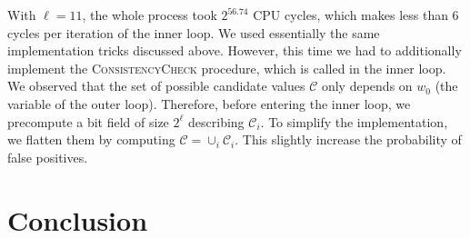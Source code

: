 \documentclass[submission,svgnames,journal=tosc]{iacrtrans}
\begin{document}
With $\ell=11$, the whole process took $2^{56.74}$ CPU cycles, which makes less
than 6 cycles per iteration of the inner loop. We used essentially the same
implementation tricks discussed above. However, this time we had to additionally
implement the \textsc{ConsistencyCheck} procedure, which is called in the inner
loop. We observed that the set of possible candidate values $\mathcal{C}$ only
depends on $w_0$ (the variable of the outer loop). Therefore, before entering
the inner loop, we precompute a bit field of size $2^\ell$ describing
$\mathcal{C}_i$. To simplify the implementation, we flatten them by computing
$\mathcal{C} = \cup_i \mathcal{C}_i$. This slightly increase the probability of
false positives.

\section{Conclusion}




\end{document}
